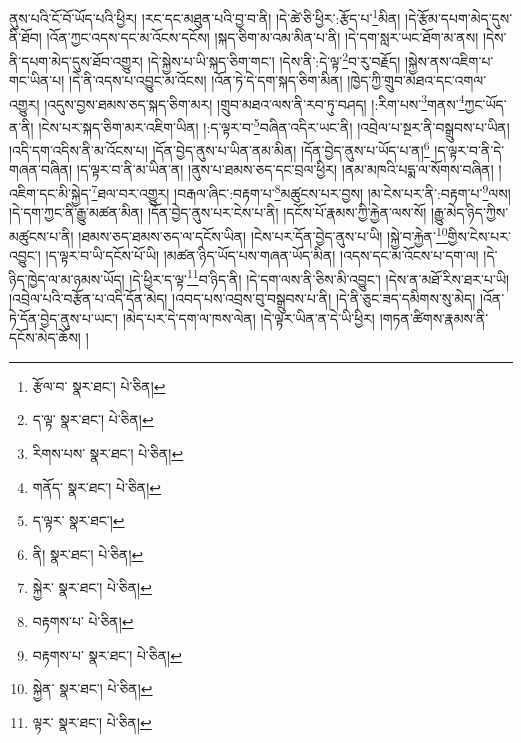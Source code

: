 ནུས་པའི་ངོ་བོ་ཡོད་པའི་ཕྱིར། །རང་དང་མཐུན་པའི་བྱ་བ་ནི། །དེ་ཚེ་ཅི་ཕྱིར་:རྩོད་པ་\footnote{རྩོལ་བ་  སྣར་ཐང་།  པེ་ཅིན། }མིན། །དེ་རྩོམ་དཔག་མེད་དུས་ནི་ཐོབ། །འོན་ཀྱང་འདས་དང་མ་འོངས་དངོས། །སྐད་ཅིག་མ་འམ་མིན་པ་ནི། །དེ་དག་སླར་ཡང་ཐོག་མ་ནས། །དེས་ནི་དཔག་མེད་དུས་ཐོབ་འགྱུར། །དེ་སྐྱེས་པ་ཡི་སྐད་ཅིག་གང་། །དེས་ནི་:དེ་ལྟ་\footnote{ད་ལྟ་  སྣར་ཐང་།  པེ་ཅིན། }བ་རུ་བརྗོད། །སྐྱེས་ནས་འཇིག་པ་གང་ཡིན་པ། །དེ་ནི་འདས་པ་འབྱུང་མ་འོངས། །འོན་ཏེ་དེ་དག་སྐད་ཅིག་མིན། །ཁྱེད་ཀྱི་གྲུབ་མཐའ་དང་འགལ་འགྱུར། །འདུས་བྱས་ཐམས་ཅད་སྐད་ཅིག་མར། །གྲུབ་མཐའ་ལས་ནི་རབ་ཏུ་བཤད། །:རིག་པས་\footnote{རིགས་པས་  སྣར་ཐང་།  པེ་ཅིན། }གནས་\footnote{གནོད་  སྣར་ཐང་།  པེ་ཅིན། }ཀྱང་ཡོད་ན་ནི། །ངེས་པར་སྐད་ཅིག་མར་འཇིག་ཡིན། །:ད་ལྟར་བ་\footnote{ད་ལྟར་  སྣར་ཐང་། }བཞིན་འདིར་ཡང་ནི། །འབྲེལ་པ་སྔར་ནི་བསྒྲུབས་པ་ཡིན། །འདི་དག་འདིས་ནི་མ་འོངས་པ། །དོན་བྱེད་ནུས་པ་ཡིན་ནམ་མིན། །དོན་བྱེད་ནུས་པ་ཡོད་པ་ན།\footnote{ནི།  སྣར་ཐང་།  པེ་ཅིན། } །ད་ལྟར་བ་ནི་དེ་གཞན་བཞིན། །ད་ལྟར་བ་ནི་མ་ཡིན་ན། །ནུས་པ་ཐམས་ཅད་དང་བྲལ་ཕྱིར། །ནམ་མཁའི་པདྨ་ལ་སོགས་བཞིན། །འཇིག་དང་མི་སྐྱེད་\footnote{སྐྱེར་  སྣར་ཐང་།  པེ་ཅིན། }ཐལ་བར་འགྱུར། །བརྒལ་ཞིང་:བརྟག་པ་\footnote{བརྟགས་པ་  པེ་ཅིན། }མཚུངས་པར་བྱས། །མ་ངེས་པར་ནི་:བརྟག་པ་\footnote{བརྟགས་པ་  སྣར་ཐང་།  པེ་ཅིན། }ལས། །དེ་དག་ཀྱང་ནི་རྒྱུ་མཚན་མིན། །དོན་བྱེད་ནུས་པར་ངེས་པ་ནི། །དངོས་པོ་རྣམས་ཀྱི་རྐྱེན་ལས་སོ། །རྒྱུ་མེད་ཉིད་ཀྱིས་མཚུངས་པ་ནི། །ཐམས་ཅད་ཐམས་ཅད་ལ་དངོས་ཡིན། །ངེས་པར་དོན་བྱེད་ནུས་པ་ཡི། །སྐྱེ་བ་རྐྱེན་\footnote{སྐྱེན་  སྣར་ཐང་།  པེ་ཅིན། }གྱིས་ངེས་པར་འབྱུང་། །ད་ལྟར་བ་ཡི་དངོས་པོ་ཡི། །མཚན་ཉིད་ཡོད་པས་གཞན་ཡོད་མིན། །འདས་དང་མ་འོངས་པ་དག་ལ། །དེ་ཉིད་ཁྱེད་ལ་མ་ཉམས་ཡོད། །དེ་ཕྱིར་ད་ལྟ་\footnote{ལྟར་  སྣར་ཐང་།  པེ་ཅིན། }བ་ཉིད་ནི། །དེ་དག་ལས་ནི་ཅིས་མི་འབྱུང་། །དེས་ན་མཐོ་རིས་ཐར་པ་ཡི། །འབྲེལ་པའི་བརྩོན་པ་འདི་དོན་མེད། །འབད་པས་འབྲས་བུ་བསྒྲུབས་པ་ནི། །དེ་ནི་ཅུང་ཟད་དམིགས་སུ་མེད། །འོན་ཏེ་དོན་བྱེད་ནུས་པ་ཡང་། །མེད་པར་དེ་དག་ལ་ཁས་ལེན། །དེ་ལྟར་ཡིན་ན་དེ་ཡི་ཕྱིར། །གཏན་ཚིགས་རྣམས་ནི་དངོས་མེད་ཆོས། །
